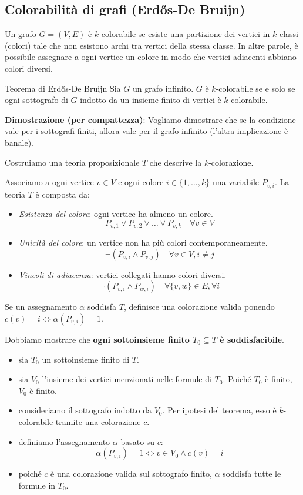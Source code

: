 \documentclass[a4paper,11pt]{report}
\begin{document}
\subsection*{Colorabilità di grafi (Erdős-De Bruijn)}
Un grafo \( G=(V,E) \) è \( k \)-colorabile se esiste una partizione dei vertici in \( k \) classi (colori) tale che non esistono archi tra vertici della stessa classe. In altre parole, è possibile assegnare a ogni vertice un colore in modo che vertici adiacenti abbiano colori diversi.

\begin{thmframe}{Teorema di Erdős-De Bruijn}{}
Sia \( G \) un grafo infinito. \( G \) è \( k \)-colorabile se e solo se ogni sottografo di \( G \) indotto da un insieme finito di vertici è \( k \)-colorabile.
\end{thmframe}

\textbf{Dimostrazione (per compattezza)}:
Vogliamo dimostrare che se la condizione vale per i sottografi finiti, allora vale per il grafo infinito (l'altra implicazione è banale).

Costruiamo una teoria proposizionale \( T \) che descrive la \( k \)-colorazione.

Associamo a ogni vertice \( v \in V \) e ogni colore \( i \in \{1, \dots, k\} \) una variabile \( P_{v,i} \). La teoria \( T \) è composta da:

\begin{itemize}
    \item \textit{Esistenza del colore}: ogni vertice ha almeno un colore.
    \[ P_{v,1} \lor P_{v,2} \lor \dots \lor P_{v,k} \quad \forall v \in V \]
    \item \textit{Unicità del colore}: un vertice non ha più colori contemporaneamente.
    \[ \neg(P_{v,i} \land P_{v,j}) \quad \forall v \in V, i \neq j \]
    \item \textit{Vincoli di adiacenza}: vertici collegati hanno colori diversi.
    \[ \neg(P_{v,i} \land P_{w,i}) \quad \forall \{v,w\} \in E, \forall i \]
\end{itemize}

Se un assegnamento \( \alpha \) soddisfa \( T \), definisce una colorazione valida ponendo \( c(v)=i \iff \alpha(P_{v,i})=1 \).

Dobbiamo mostrare che \textbf{ogni sottoinsieme finito \( T_0 \subseteq T \) è soddisfacibile}.
\begin{itemize}
    \item sia \( T_0 \) un sottoinsieme finito di \( T \).
    \item sia \( V_0 \) l'insieme dei vertici menzionati nelle formule di \( T_0 \). Poiché \( T_0 \) è finito, \( V_0 \) è finito.
    \item consideriamo il sottografo indotto da \( V_0 \). Per ipotesi del teorema, esso è \( k \)-colorabile tramite una colorazione \( c \).
    \item definiamo l'assegnamento \( \alpha \) basato su \( c \):
    \[ \alpha(P_{v,i}) = 1 \iff v \in V_0 \land c(v) = i \]
    \item poiché \( c \) è una colorazione valida sul sottografo finito, \( \alpha \) soddisfa tutte le formule in \( T_0 \).
\end{itemize}
\end{document}
